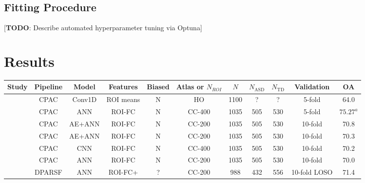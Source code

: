 \documentclass[10pt]{article}
\begin{document}
\subsection{Fitting Procedure}

[\textbf{TODO}: Describe automated hyperparameter tuning via Optuna]


\section{Results}




\newpage
\begin{landscape}

\begin{table}
  \small
  \centering
  \begin{tabular}{lcccccccccc}
    \toprule
    Study                                                         & Pipeline & Model  & Features & Biased &Atlas or \(N_{ROI}\)  & \(N\) & \(N_\text{ASD}\) & \(N_{\text{TD}}\) & Validation & OA \\
    \midrule
    \citeauthor{el-gazzarHybrid3DCNN3DCLSTM2019}                       &   CPAC   & Conv1D & ROI means&   N    &     HO     & 1100  &   ?   &   ?   &   5-fold   &       64.0       \\
    \citeauthor{yangDeepNeuralNetwork2020}                             &   CPAC   &  ANN   &  ROI-FC  &   N    &   CC-400   & 1035  &  505  &  530  &   5-fold   &     \(75.27^a\)  \\
    \citeauthor{almuqhimASDSAENetSparseAutoencoder2021}                &   CPAC   & AE+ANN &  ROI-FC  &   N    &   CC-200   & 1035  &  505  &  530  &  10-fold   &       70.8       \\
    \citeauthor{eslamiASDDiagNetHybridLearning2019}                    &   CPAC   & AE+ANN &  ROI-FC  &   N    &   CC-200   & 1035  &  505  &  530  &  10-fold   &       70.3       \\
    \citeauthor{sherkatghanadAutomatedDetectionAutism2020}             &   CPAC   &  CNN   &  ROI-FC  &   N    &   CC-400   & 1035  &  505  &  530  &  10-fold   &       70.2       \\
    \citeauthor{heinsfeldIdentificationAutismSpectrum2018}             &   CPAC   &   ANN  &  ROI-FC  &   N    &   CC-200   & 1035  &  505  &  530  &  10-fold   &       70.0       \\
    \citeauthor{ingalhalikarFunctionalConnectivitybasedPrediction2021} &  DPARSF  &  ANN   &  ROI-FC+ &   ?    &   CC-200   &  988  &  432  &  556  &10-fold LOSO&       71.4       \\

\end{tabular}
\end{table}
\end{landscape}
\end{document}
